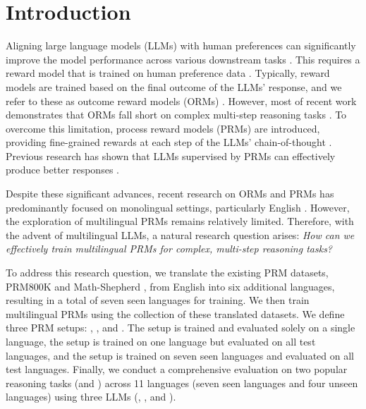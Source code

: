 \section{Introduction}
\label{sec:intro}


Aligning large language models (LLMs) with human preferences can significantly improve the model performance across various downstream tasks \citep{christiano2017deep,ziegler2019fine}. This requires a reward model that is trained on human preference data \citep{ziegler2019fine,stiennon2020learning,shen2021generate,ouyang2022training}. Typically, reward models are trained based on the final outcome of the LLMs' response, and we refer to these as outcome reward models (ORMs) \citep{orm1,solving,orm2}. However, most of recent work demonstrates that ORMs fall short on complex multi-step reasoning tasks \citep{solving,deepseek}. To overcome this limitation, process reward models (PRMs) are introduced, providing fine-grained rewards at each step of the LLMs' chain-of-thought \citep{prm800k,making,shepherd,let}. Previous research has shown that LLMs supervised by PRMs can effectively produce better responses \citep{shepherd,deepseek}.



Despite these significant advances, recent research on ORMs and PRMs has predominantly focused on monolingual settings, particularly English \citep{prm800k,openr,shepherd}. However, the exploration of multilingual PRMs remains relatively limited. Therefore, with the advent of multilingual LLMs, a natural research question arises: \textit{How can we effectively train multilingual PRMs for complex, multi-step reasoning tasks?}



To address this research question, we translate the existing PRM datasets, PRM800K \citep{prm800k} and Math-Shepherd \citep{shepherd}, from English into six additional languages, resulting in a total of seven seen languages for training. We then train multilingual PRMs using the collection of these translated datasets. We define three PRM setups: \mono, \en, and \mix. The \mono setup is trained and evaluated solely on a single language, the \en setup is trained on one language but evaluated on all test languages, and the \mix setup is trained on seven seen languages and evaluated on all test languages. Finally, we conduct a comprehensive evaluation on two popular reasoning tasks (\mathset and \mgsmset) across 11 languages (seven seen languages and four unseen languages) using three LLMs (\mistral, \llama, and \deepseek).


